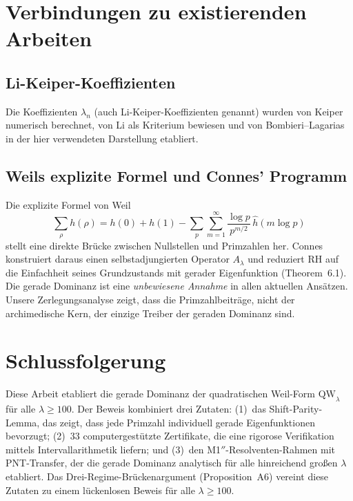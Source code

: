 \documentclass[12pt,a4paper]{article}
\theoremstyle{definition}
\theoremstyle{remark}
\begin{document}
\section{Verbindungen zu existierenden Arbeiten}

\subsection{Li-Keiper-Koeffizienten}
Die Koeffizienten $\lambda_n$ (auch Li-Keiper-Koeffizienten genannt) wurden von Keiper \cite{Keiper1992} numerisch berechnet, von Li \cite{Li1997} als Kriterium bewiesen und von Bombieri--Lagarias \cite{BombieriLagarias1999} in der hier verwendeten Darstellung etabliert.

\subsection{Weils explizite Formel und Connes' Programm}
Die explizite Formel von Weil
\[ \sum_\rho h(\rho) = h(0) + h(1) - \sum_p \sum_{m=1}^\infty \frac{\log p}{p^{m/2}}\,\hat{h}(m\log p) \]
stellt eine direkte Brücke zwischen Nullstellen und Primzahlen her. Connes \cite{Connes2025} konstruiert daraus einen selbstadjungierten Operator $A_\lambda$ und reduziert RH auf die Einfachheit seines Grundzustands mit gerader Eigenfunktion (Theorem~6.1). Die gerade Dominanz ist eine \emph{unbewiesene Annahme} in allen aktuellen Ansätzen. Unsere Zerlegungsanalyse zeigt, dass die Primzahlbeiträge, nicht der archimedische Kern, der einzige Treiber der geraden Dominanz sind.


\section{Schlussfolgerung}

Diese Arbeit etabliert die gerade Dominanz der quadratischen Weil-Form $\mathrm{QW}_\lambda$ für alle $\lambda \geq 100$. Der Beweis kombiniert drei Zutaten: (1)~das Shift-Parity-Lemma, das zeigt, dass jede Primzahl individuell gerade Eigenfunktionen bevorzugt; (2)~$33$ computergestützte Zertifikate, die eine rigorose Verifikation mittels Intervallarithmetik liefern; und (3)~den M1$''$-Resolventen-Rahmen mit PNT-Transfer, der die gerade Dominanz analytisch für alle hinreichend großen $\lambda$ etabliert. Das Drei-Regime-Brückenargument (Proposition~A6) vereint diese Zutaten zu einem lückenlosen Beweis für alle $\lambda \geq 100$.
\end{document}
